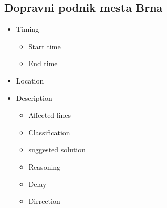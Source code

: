 \subsection{Dopravni podnik mesta Brna}
\begin{itemize}
\item Timing
	\begin{itemize}
	\item Start time
	\item End time
	\end{itemize}
\item Location
\item Description
	\begin{itemize}
	\item Affected lines
	\item Classification
	\item suggested solution
	\item Reasoning
	\item Delay
	\item Dirrection
	\end{itemize}
\end{itemize}